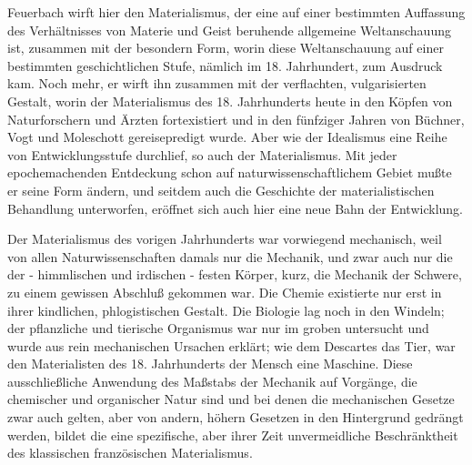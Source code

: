 Feuerbach wirft hier den Materialismus, der eine auf einer
bestimmten Auffassung des Verhältnisses von Materie und Geist beruhende
allgemeine Weltanschauung ist, zusammen mit der besondern Form, worin
diese Weltanschauung auf einer bestimmten geschichtlichen Stufe, nämlich
im 18. Jahrhundert, zum Ausdruck kam. Noch mehr, er wirft ihn zusammen
mit der verflachten, vulgarisierten Gestalt, worin der Materialismus des
18. Jahrhunderts heute in den Köpfen von Naturforschern und Ärzten
fortexistiert und in den fünfziger Jahren von Büchner, Vogt und
Moleschott gereisepredigt wurde. Aber wie der Idealismus eine Reihe von
Entwicklungsstufe durchlief, so auch der Materialismus. Mit jeder
epochemachenden Entdeckung schon auf naturwissenschaftlichem Gebiet
mußte er seine Form ändern, und seitdem auch die Geschichte der
materialistischen Behandlung unterworfen, eröffnet sich auch hier eine
neue Bahn der Entwicklung.

Der Materialismus des vorigen Jahrhunderts war vorwiegend
mechanisch, weil von allen Naturwissenschaften damals nur die Mechanik,
und zwar auch nur die der - himmlischen und irdischen - festen Körper,
kurz, die Mechanik der Schwere, zu einem gewissen Abschluß gekommen war.
Die Chemie existierte nur erst in ihrer kindlichen, phlogistischen
Gestalt. Die Biologie lag noch in den Windeln; der pflanzliche und
tierische Organismus war nur im groben untersucht und wurde aus rein
mechanischen Ursachen erklärt; wie dem Descartes das Tier, war den
Materialisten des 18. Jahrhunderts der Mensch eine Maschine. Diese
ausschließliche Anwendung des Maßstabs der Mechanik auf Vorgänge, die
chemischer und organischer Natur sind und bei denen die mechanischen
Gesetze zwar auch gelten, aber von andern, höhern Gesetzen in den
Hintergrund gedrängt werden, bildet die eine spezifische, aber ihrer
Zeit unvermeidliche Beschränktheit des klassischen französischen
Materialismus.

